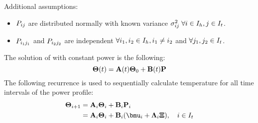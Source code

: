 Additional assumptions:
\begin{itemize}
  \item $P_{ij}$ are distributed normally with known variance $\sigma_{ij}^2 \; \forall i \in I_h, j \in I_t$.
  \item $P_{i_1 j_1}$ and $P_{i_2 j_2}$ are independent $\forall i_1, i_2 \in I_h,  i_1 \neq i_2$ and $\forall j_1, j_2 \in I_t$.
\end{itemize}

The solution of  with constant power is the following:
\[
  \mathbf{\Theta}(t) = \mathbf{A}(t) \mathbf{\Theta}_0 + \mathbf{B}(t) \mathbf{P}
\]
The following recurrence is used to sequentially calculate temperature for all time intervals of the power profile:
\begin{align}
  \vtemperature_{i + 1} & = \m{A}_i \vtemperature_i + \m{B}_i \vpower_i \nonumber \\
  & = \m{A}_i \vtemperature_i + \m{B}_i (\vmean{i} + \ddeviation{i} \vstdnormal), \sep i \in \timeindex \equlabel{ta-fourier-recurrence}
\end{align}

